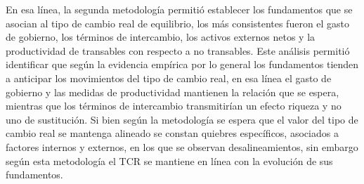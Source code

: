 \documentclass[12pt,letterpaper]{article}
\begin{document}

En esa línea, la segunda metodología permitió establecer los fundamentos que se asocian al tipo de cambio real de equilibrio, los más consistentes fueron el gasto de gobierno, los términos de intercambio, los activos externos netos y la productividad de transables con respecto a no transables. Este análisis permitió identificar que según la evidencia empírica por lo general los fundamentos tienden a anticipar los movimientos del tipo de cambio real, en esa línea el gasto de gobierno y las medidas de productividad mantienen la relación que se espera, mientras que los términos de intercambio transmitirían un efecto riqueza y no uno de sustitución. Si bien según la metodología se espera que el valor del tipo de cambio real se mantenga alineado se constan quiebres específicos, asociados a factores internos y externos, en los que se observan desalineamientos, sin embargo según esta metodología el TCR se mantiene en línea con la evolución de sus fundamentos. 







\end{document}
